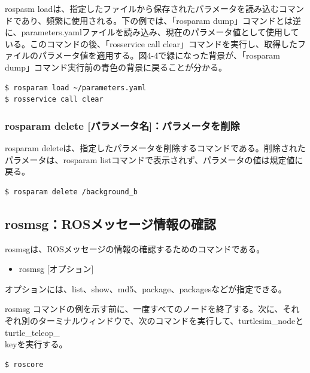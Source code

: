 rospasm loadは、指定したファイルから保存されたパラメータを読み込むコマンドであり、頻繁に使用される。下の例では、「rosparam dump」コマンドとは逆に、parameters.yamlファイルを読み込み、現在のパラメータ値として使用している。このコマンドの後、「rosservice call clear」コマンドを実行し、取得したファイルのパラメータ値を適用する。図4-4で緑になった背景が、「rosparam dump」コマンド実行前の青色の背景に戻ることが分かる。

\begin{lstlisting}[language=ROS]
$ rosparam load ~/parameters.yaml
$ rosservice call clear
\end{lstlisting}

\subsubsection{rosparam delete [パラメータ名]：パラメータを削除}

rosparam deleteは、指定したパラメータを削除するコマンドである。削除されたパラメータは、rosparam listコマンドで表示されず、パラメータの値は規定値に戻る。

\begin{lstlisting}[language=ROS]
$ rosparam delete /background_b
\end{lstlisting}

\subsection{rosmsg：ROSメッセージ情報の確認}

rosmsgは、ROSメッセージの情報の確認するためのコマンドである。

\begin{itemize}
\item   rosmsg [オプション]
\end{itemize}

オプションには、list、show、md5、package、packagesなどが指定できる。

rosmsg コマンドの例を示す前に、一度すべてのノードを終了する。次に、それぞれ別のターミナルウィンドウで、次のコマンドを実行して、turtlesim\_nodeとturtle\_teleop\_\\keyを実行する。

\begin{lstlisting}[language=ROS]
$ roscore
\end{lstlisting}

